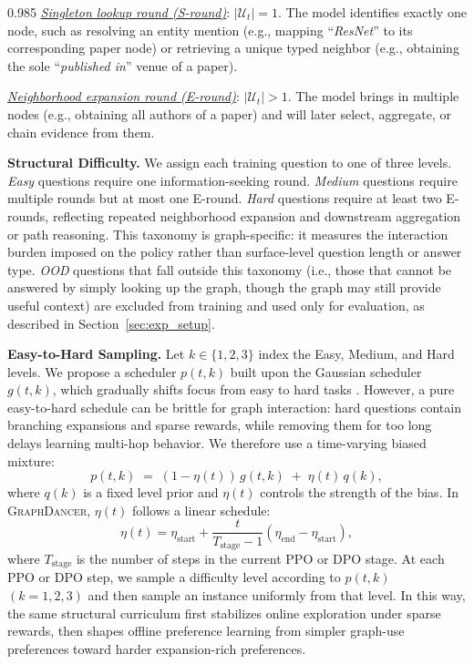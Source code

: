 \documentclass[11pt]{article}
\newcommand{\ours}{\textsc{GraphDancer}\xspace}
\begin{document}
\begin{spacing}{0.985}
\smallskip
\noindent \underline{\textit{Singleton lookup round (S-round)}}: $|\mathcal{U}_t| = 1$.
The model identifies exactly one node, such as resolving an entity mention (e.g., mapping ``\textit{ResNet}'' to its corresponding paper node) or retrieving a unique typed neighbor (e.g., obtaining the sole ``\textit{published in}'' venue of a paper).

\smallskip
\noindent \underline{\textit{Neighborhood expansion round (E-round)}}: $|\mathcal{U}_t| > 1$.
The model brings in multiple nodes (e.g., obtaining all authors of a paper) and will later select, aggregate, or chain evidence from them.

\smallskip
\noindent\textbf{Structural Difficulty.}
We assign each training question to one of three levels.
\textit{Easy} questions require one information-seeking round.
\textit{Medium} questions require multiple rounds but at most one E-round.
\textit{Hard} questions require at least two E-rounds, reflecting repeated neighborhood expansion and downstream aggregation or path reasoning.
This taxonomy is graph-specific: it measures the interaction burden imposed on the policy rather than surface-level question length or answer type.
\textit{OOD} questions that fall outside this taxonomy (i.e., those that cannot be answered by simply looking up the graph, though the graph may still provide useful context) are excluded from training and used only for evaluation, as described in Section~\ref{sec:exp_setup}.

\smallskip
\noindent\textbf{Easy-to-Hard Sampling.}
Let $k\in\{1,2,3\}$ index the Easy, Medium, and Hard levels.
We propose a scheduler $p(t,k)$ built upon the Gaussian scheduler $g(t,k)$, which gradually shifts focus from easy to hard tasks \cite{parashar2025curriculum}. However, a pure easy-to-hard schedule can be brittle for graph interaction: hard questions contain branching expansions and sparse rewards, while removing them for too long delays learning multi-hop behavior.
We therefore use a time-varying biased mixture:
\begin{equation}
p(t,k) \;=\; (1-\eta(t))\,g(t,k) \;+\; \eta(t)\,q(k),
\label{eq:mixture_sampler}
\end{equation}
where $q(k)$ is a fixed level prior and $\eta(t)$ controls the strength of the bias.
In \ours, $\eta(t)$ follows a linear schedule:
\begin{equation}
\eta(t) = \eta_{\text{start}} + \frac{t}{T_{\text{stage}}-1}(\eta_{\text{end}} - \eta_{\text{start}}),
\label{eq:eta_schedule}
\end{equation}
where $T_{\text{stage}}$ is the number of steps in the current PPO or DPO stage.
At each PPO or DPO step, we sample a difficulty level according to $p(t,k)$ $(k=1,2,3)$ and then sample an instance uniformly from that level.
In this way, the same structural curriculum first stabilizes online exploration under sparse rewards, then shapes offline preference learning from simpler graph-use preferences toward harder expansion-rich preferences.


\end{spacing}
\end{document}
